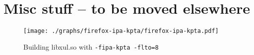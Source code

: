 \chapter{Misc stuff -- to be moved elsewhere}

\begin{figure}[h!]
	\label{figure-firefox-ipa-kpta}
	\centering
	\texttt{[image: ./graphs/firefox-ipa-kpta/firefox-ipa-kpta.pdf]}
	\caption{Building libxul.so with {\tt -fipa-kpta -flto=8}}
\end{figure}


